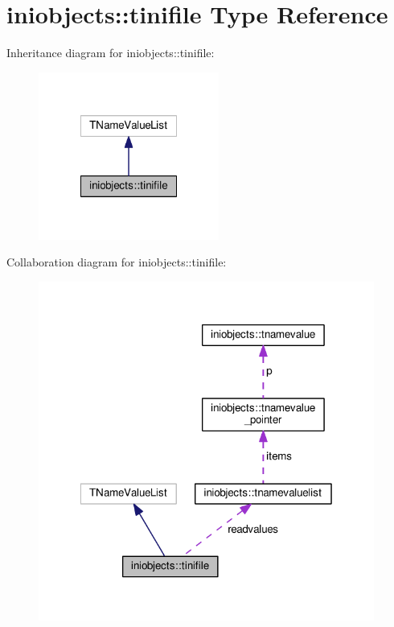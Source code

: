 \hypertarget{structiniobjects_1_1tinifile}{}\section{iniobjects\+:\+:tinifile Type Reference}
\label{structiniobjects_1_1tinifile}


Inheritance diagram for iniobjects\+:\+:tinifile\+:
\nopagebreak
\begin{figure}[H]
\begin{center}
\leavevmode
\includegraphics[width=168pt]{structiniobjects_1_1tinifile__inherit__graph}
\end{center}
\end{figure}


Collaboration diagram for iniobjects\+:\+:tinifile\+:
\nopagebreak
\begin{figure}[H]
\begin{center}
\leavevmode
\includegraphics[width=313pt]{structiniobjects_1_1tinifile__coll__graph}
\end{center}
\end{figure}
